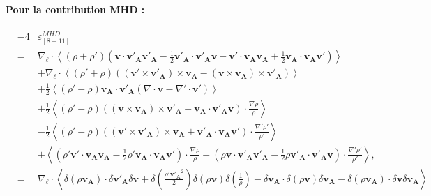 \paragraph{Pour la contribution \ac{MHD} :} 
\begin{eqnarray}
  \label{eq:turb_bin_TEMI}  &-4&  \varepsilon^{MHD}_{[8-11]} \nonumber\\
    &=&\nabla_{\boldsymbol{\ell}} \cdot  \left<( \rho + \rho' )( \boldsymbol{v} \cdot  \boldsymbol{v'_A}  \boldsymbol{v'_A} - \frac{1}{2} \boldsymbol{v'_A} \cdot \boldsymbol{v'_A} \boldsymbol{v} - \boldsymbol{v'} \cdot  \boldsymbol{v_A}  \boldsymbol{v_A} + \frac{1}{2} \boldsymbol{v_A} \cdot \boldsymbol{v_A} \boldsymbol{v'})\right> \nonumber\\
    &&+ \nabla_{\boldsymbol{\ell}} \cdot \left< (\rho' + \rho) ((\boldsymbol{v'}  \times \boldsymbol{v'_A})\times \boldsymbol{v_A} -  (\boldsymbol{v}  \times \boldsymbol{v_A})\times \boldsymbol{v'_A})\right> \nonumber\\
    &&+  \frac{1}{2}\left<(\rho' - \rho) \boldsymbol{v_A} \cdot \boldsymbol{v'_{A}} (  \nabla \cdot \boldsymbol{v}-  \nabla' \cdot \boldsymbol{v'})\right> \nonumber\\ 
  &&+\frac{1}{2} \left<(\rho' - \rho) ( (\boldsymbol{v}  \times \boldsymbol{v_A})\times \boldsymbol{v'_A} + \boldsymbol{v_A} \cdot \boldsymbol{v'_{A}} \boldsymbol{v}) \cdot \frac{\nabla  \rho }{\rho}\right> \nonumber\\
  &&- \frac{1}{2} \left<(\rho' - \rho)( (\boldsymbol{v'}  \times \boldsymbol{v'_A})\times \boldsymbol{v_A}  + \boldsymbol{v'_A} \cdot \boldsymbol{v_{A}} \boldsymbol{v'}) \cdot \frac{\nabla'  \rho' }{\rho'}\right> \nonumber\\
         &&+ \left<( \rho'   \boldsymbol{v'} \cdot  \boldsymbol{v_A}  \boldsymbol{v_A} - \frac{1}{2} \rho' \boldsymbol{v_A} \cdot \boldsymbol{v_A} \boldsymbol{v'})\cdot  \frac{\nabla\rho}{\rho} 
         +(  \rho \boldsymbol{v} \cdot  \boldsymbol{v'_A}  \boldsymbol{v'_A} - \frac{1}{2} \rho \boldsymbol{v'_A} \cdot \boldsymbol{v'_A} \boldsymbol{v})\cdot \frac{\nabla'\rho'}{\rho'}     \right>, \nonumber\\
    &=&\nabla_{\boldsymbol{\ell}} \cdot  \left< \delta (\rho \boldsymbol{v_A}) \cdot \delta \boldsymbol{v'_A} \delta \boldsymbol{v} + \delta(\frac{\rho' \boldsymbol{v'_A}^2}{2}) \delta( \rho \boldsymbol{v}) \delta (\frac{1}{\rho})-  \delta \boldsymbol{v_A}\cdot \delta (\rho \boldsymbol{v})\delta  \boldsymbol{v_A} -  \delta( \rho \boldsymbol{v_A}) \cdot \delta \boldsymbol{v} \delta \boldsymbol{v_A} \right>  \nonumber\\

\end{eqnarray}
